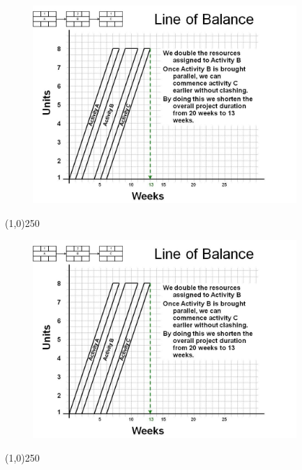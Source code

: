 \begin{frame}
\begin{figure}
	\centering
		\includegraphics[width = 10.0cm]{oldnotes/Slide253.jpg}
\end{figure}
\end{frame}
\begin{center}\line(1,0){250}\end{center}






\begin{frame}
\begin{figure}
	\centering
		\includegraphics[width = 10.0cm]{oldnotes/Slide253.jpg}
\end{figure}
\end{frame}
\begin{center}\line(1,0){250}\end{center}






